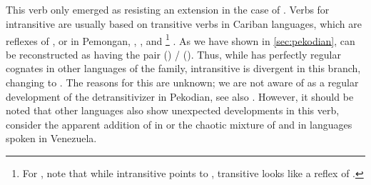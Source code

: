 \subsection{\PPek {} }
\label{sec:bathe}
This verb only emerged as resisting an extension in the case of \PPek {}.
Verbs for intransitive  are usually based on transitive verbs in Cariban languages, which are reflexes of , or  in Pemongan, \panare, \kalina, and \maqui\footnote{For \maqui, note that while intransitive  points to , transitive  looks like a reflex of .} .
As we have shown in \cref{sec:pekodian}, \PPek can be reconstructed as having the pair  () /  ().
Thus, while \PPek {} has perfectly regular cognates in other languages of the family, intransitive  is divergent in this branch, changing  to .
The reasons for this are unknown; we are not aware of  as a regular development of the detransitivizer in Pekodian, see also \textcite[506]{meira2010origin}.
However, it should be noted that other languages also show unexpected developments in this verb, consider the apparent addition of  in \hixka or the chaotic mixture of  and  in languages spoken in Venezuela.


